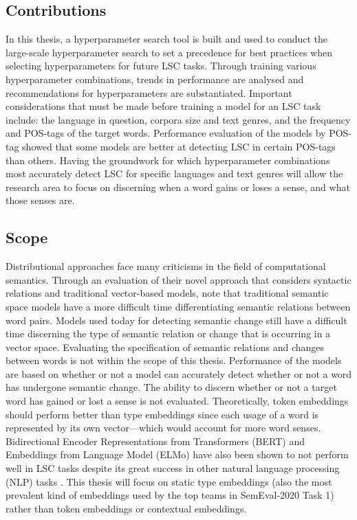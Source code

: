 \subsection{Contributions}
In this thesis, a hyperparameter search tool is built and used to conduct the large-scale hyperparameter search to set a precedence for best practices when selecting hyperparameters for future LSC tasks. Through training various hyperparameter combinations, trends in performance are analysed and recommendations for hyperparameters are substantiated. Important considerations that must be made before training a model for an LSC task include: the language in question, corpora size and text genres, and the frequency and POS-tags of the target words. Performance evaluation of the models by POS-tag showed that some models are better at detecting LSC in certain POS-tags than others. Having the groundwork for which hyperparameter combinations most accurately detect LSC for specific languages and text genres will allow the research area to focus on discerning when a word gains or loses a sense, and what those senses are. 


\subsection{Scope}
\label{intro-scope}

Distributional approaches face many criticisms in the field of computational semantics. Through an evaluation of their novel approach that considers syntactic relations and traditional vector-based models, \citet{pado-lapata-2003-constructing} note that traditional semantic space models have a more difficult time differentiating semantic relations between word pairs. Models used today for detecting semantic change still have a difficult time discerning the type of semantic relation or change that is occurring in a vector space. Evaluating the specification of semantic relations and changes between words is not within the scope of this thesis. Performance of the models are based on whether or not a model can accurately detect whether or not a word has undergone semantic change. The ability to discern whether or not a target word has gained or lost a sense is not evaluated. Theoretically, token embeddings should perform better than type embeddings since each usage of a word is represented by its own vector—which would account for more word senses. Bidirectional Encoder Representations from Transformers (BERT) and Embeddings from Language Model (ELMo) have also been shown to not perform well in LSC tasks despite its great success in other natural language processing (NLP) tasks \citep{schlechtweg-etal-2020-semeval}. This thesis will focus on static type embeddings (also the most prevalent kind of embeddings used by the top teams in SemEval-2020 Task 1) rather than token embeddings or contextual embeddings. 

